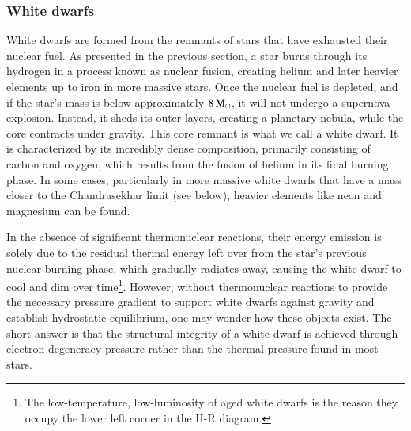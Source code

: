 \documentclass[main.tex]{subfiles}
\begin{document}
    \subsubsection{White dwarfs}
    White dwarfs are formed from the remnants of stars that have exhausted their nuclear fuel. As presented in the previous section, a star burns through its hydrogen in a process known as nuclear fusion, creating helium and later heavier elements up to iron in more massive stars. Once the nuclear fuel is depleted, and if the star's mass is below approximately $8\mathrm{\,M_\odot}$, it will not undergo a supernova explosion. Instead, it sheds its outer layers, creating a planetary nebula, while the core contracts under gravity. This core remnant is what we call a white dwarf. It is characterized by its incredibly dense composition, primarily consisting of carbon and oxygen, which results from the fusion of helium in its final burning phase.  In some cases, particularly in more massive white dwarfs that have a mass closer to the Chandrasekhar limit (see below), heavier elements like neon and magnesium can be found.

    In the absence of significant thermonuclear reactions, their energy emission is solely due to the residual thermal energy left over from the star's previous nuclear burning phase, which gradually radiates away, causing the white dwarf to cool and dim over time\footnote{The low-temperature, low-luminosity of aged white dwarfs is the reason they occupy the lower left corner in the H-R diagram.}. However, without thermonuclear reactions to provide the necessary pressure gradient to support white dwarfs against gravity and establish hydrostatic equilibrium, one may wonder how these objects exist. The short answer is that the structural integrity of a white dwarf is achieved through electron degeneracy pressure rather than the thermal pressure found in most stars. 
\end{document}
